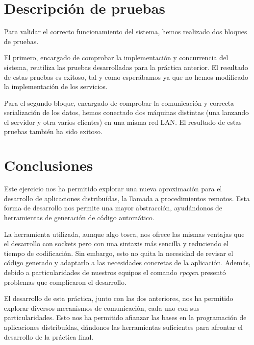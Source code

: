 \documentclass[]{article}
\begin{document}
\section{Descripción de pruebas}
\label{sec:descripcion_de_pruebas}
Para validar el correcto funcionamiento del sistema, hemos realizado dos bloques de pruebas. 

El primero, encargado de comprobar la implementación y concurrencia del sistema, reutiliza las pruebas desarrolladas para la práctica anterior. El resultado de estas pruebas es exitoso, tal y como esperábamos ya que no hemos modificado la implementación de los servicios.

Para el segundo bloque, encargado de comprobar la comunicación y correcta serialización de los datos, hemos conectado dos máquinas distintas (una lanzando el servidor y otra varios clientes) en una misma red LAN. El resultado de estas pruebas también ha sido exitoso.

\section{Conclusiones}
\label{sec:conclusiones}
Este ejercicio nos ha permitido explorar una nueva aproximación para el desarrollo de aplicaciones distribuídas, la llamada a procedimientos remotos. Esta forma de desarrollo nos permite una mayor abstracción, ayudándonos de herramientas de generación de código automático. 

La herramienta utilizada, aunque algo tosca, nos ofrece las mismas ventajas que el desarrollo con sockets pero con una sintaxis más sencilla y reduciendo el tiempo de codificación. Sin embargo, esto no quita la necesidad de revisar el código generado y adaptarlo a las necesidades concretas de la aplicación. Además, debido a particularidades de nuestros equipos el comando \textit{rpcgen} presentó problemas que complicaron el desarrollo. 

El desarrollo de esta práctica, junto con las dos anteriores, nos ha permitido explorar diversos mecanismos de comunicación, cada uno con sus particularidades. Esto nos ha permitido afianzar las bases en la programación de aplicaciones distribuídas, dándonos las herramientas suficientes para afrontar el desarrollo de la práctica final. 
\end{document}
